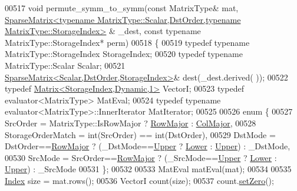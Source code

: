 \begin{DoxyCode}
00517 \textcolor{keywordtype}{void} permute\_symm\_to\_symm(\textcolor{keyword}{const} MatrixType& mat, 
      \hyperlink{group___sparse_core___module_class_eigen_1_1_sparse_matrix}{SparseMatrix<typename MatrixType::Scalar,DstOrder,typename MatrixType::StorageIndex>}
      & \_dest, \textcolor{keyword}{const} \textcolor{keyword}{typename} MatrixType::StorageIndex* perm)
00518 \{
00519   \textcolor{keyword}{typedef} \textcolor{keyword}{typename} MatrixType::StorageIndex StorageIndex;
00520   \textcolor{keyword}{typedef} \textcolor{keyword}{typename} MatrixType::Scalar Scalar;
00521   \hyperlink{group___sparse_core___module_class_eigen_1_1_sparse_matrix}{SparseMatrix<Scalar,DstOrder,StorageIndex>}& dest(\_dest.derived(
      ));
00522   \textcolor{keyword}{typedef} \hyperlink{group___core___module}{Matrix<StorageIndex,Dynamic,1>} VectorI;
00523   \textcolor{keyword}{typedef} evaluator<MatrixType> MatEval;
00524   \textcolor{keyword}{typedef} \textcolor{keyword}{typename} evaluator<MatrixType>::InnerIterator MatIterator;
00525 
00526   \textcolor{keyword}{enum} \{
00527     SrcOrder = MatrixType::IsRowMajor ? \hyperlink{group__enums_ggaacded1a18ae58b0f554751f6cdf9eb13acfcde9cd8677c5f7caf6bd603666aae3}{RowMajor} : \hyperlink{group__enums_ggaacded1a18ae58b0f554751f6cdf9eb13a0cbd4bdd0abcfc0224c5fcb5e4f6669a}{ColMajor},
00528     StorageOrderMatch = int(SrcOrder) == int(DstOrder),
00529     DstMode = DstOrder==\hyperlink{group__enums_ggaacded1a18ae58b0f554751f6cdf9eb13acfcde9cd8677c5f7caf6bd603666aae3}{RowMajor} ? (\_DstMode==\hyperlink{group__enums_gga39e3366ff5554d731e7dc8bb642f83cda6bcb58be3b8b8ec84859ce0c5ac0aaec}{Upper} ? \hyperlink{group__enums_gga39e3366ff5554d731e7dc8bb642f83cda891792b8ed394f7607ab16dd716f60e6}{Lower} : 
      \hyperlink{group__enums_gga39e3366ff5554d731e7dc8bb642f83cda6bcb58be3b8b8ec84859ce0c5ac0aaec}{Upper}) : \_DstMode,
00530     SrcMode = SrcOrder==\hyperlink{group__enums_ggaacded1a18ae58b0f554751f6cdf9eb13acfcde9cd8677c5f7caf6bd603666aae3}{RowMajor} ? (\_SrcMode==\hyperlink{group__enums_gga39e3366ff5554d731e7dc8bb642f83cda6bcb58be3b8b8ec84859ce0c5ac0aaec}{Upper} ? \hyperlink{group__enums_gga39e3366ff5554d731e7dc8bb642f83cda891792b8ed394f7607ab16dd716f60e6}{Lower} : 
      \hyperlink{group__enums_gga39e3366ff5554d731e7dc8bb642f83cda6bcb58be3b8b8ec84859ce0c5ac0aaec}{Upper}) : \_SrcMode
00531   \};
00532 
00533   MatEval matEval(mat);
00534   
00535   \hyperlink{group___core___module_a554f30542cc2316add4b1ea0a492ff02}{Index} size = mat.rows();
00536   VectorI count(size);
00537   count.\hyperlink{class_eigen_1_1_plain_object_base_ac21ad5f989f320e46958b75ac8d9a1da}{setZero}();

\end{DoxyCode}
